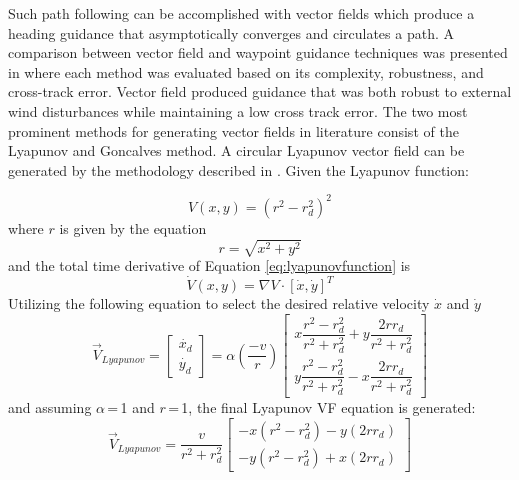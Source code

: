 \documentclass[conf]{new-aiaa}
\begin{document}
Such path following can be accomplished with vector fields which produce a heading guidance that asymptotically converges and circulates a path. A comparison between vector field and waypoint guidance techniques was presented in \cite{sujit_unmanned_2014} where each method was evaluated based on its complexity, robustness, and cross-track error. Vector field produced guidance that was both robust to external wind disturbances while maintaining a low cross track error. The two most prominent methods for generating vector fields in literature consist of the Lyapunov \cite{frew_cooperative_2007,nelson_cooperative_2005,miao_orthogonal_2016,griffiths_vector_2006} and Goncalves \cite{goncalves_artificial_2009,goncalves_circulation_2010,goncalves_vector_2010,gerlach_autonomous_2014} method. A circular Lyapunov vector field can be generated by the methodology described in \cite{frew_cooperative_2007}. Given the Lyapunov function:

\begin{equation}\label{eq:lyapunovfunction}
V(x,y) = (r^2 - r_d^2)^2
\end{equation}
where $r$ is given by the equation
\begin{equation}
r = \sqrt{x^2+y^2}
\end{equation}
and the total time derivative of Equation \ref{eq:lyapunovfunction} is
\begin{equation}\label{eq:totaltimederivative}
\dot{V}(x,y) = \nabla{V} \cdotp [\dot{x},\dot{y}]^{T}
\end{equation}
Utilizing the following equation to select the desired relative velocity $\dot{x}$ and $\dot{y}$
\begin{equation}
\overrightarrow{V}_{Lyapunov}\!=\!\begin{bmatrix} \dot{x_d} \\ \dot{y_d} \end{bmatrix}\!= \alpha\!\left(\dfrac{-v}{r}\right)\!\begin{bmatrix} x \dfrac{r^2-r_d^2}{r^2+r_d^2} + y \dfrac{2 r r_d}{r^2+r_d^2} \\[12pt] y \dfrac{r^2-r_d^2}{r^2+r_d^2} - x \dfrac{2 r r_d}{r^2+r_d^2} \end{bmatrix}
\end{equation}
and assuming $\alpha$\,=\,1 and $r$\,=\,1, the final Lyapunov VF equation is generated:
\begin{equation}\label{eq:lyapunovvf}
\overrightarrow{V}_{Lyapunov} = \frac{v}{r^2+r_d^2} \begin{bmatrix} - x (r^2-r_d^2) - y (2 r r_d) \\[6pt] - y (r^2-r_d^2) + x (2 r r_d) \end{bmatrix}
\end{equation}
\end{document}
